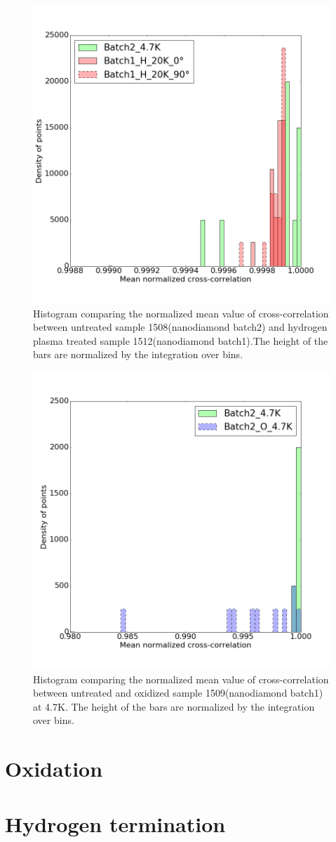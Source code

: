 \begin{figure}[h]
\centering
\includegraphics[width=0.7\linewidth]{"Figures/pic/Histogram of normalized cross-correlation_1_H_2"}
\caption{Histogram comparing the normalized mean value of cross-correlation between untreated sample 1508(nanodiamond batch2) and hydrogen plasma treated sample 1512(nanodiamond batch1).The height of the bars are normalized by the integration over bins.  }
\label{fig:histogram-of-normalized-cross-correlation1h2}
\end{figure}

\begin{figure}[h]
\centering
\includegraphics[width=0.7\linewidth]{"Figures/pic/Histogram of normalized cross-correlation_2_o"}
\caption{Histogram comparing the normalized mean value of cross-correlation between untreated and oxidized sample 1509(nanodiamond batch1) at 4.7K. The height of the bars are normalized by the integration over bins. }
\label{fig:histogram-of-normalized-cross-correlation2o}
\end{figure}


\section{Oxidation}
\section{Hydrogen termination}


